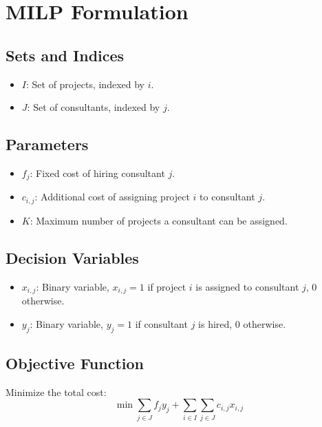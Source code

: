 \documentclass{article}
\begin{document}
\section*{MILP Formulation}

\subsection*{Sets and Indices}
\begin{itemize}
    \item \( I \): Set of projects, indexed by \( i \).
    \item \( J \): Set of consultants, indexed by \( j \).
\end{itemize}

\subsection*{Parameters}
\begin{itemize}
    \item \( f_j \): Fixed cost of hiring consultant \( j \).
    \item \( c_{i,j} \): Additional cost of assigning project \( i \) to consultant \( j \).
    \item \( K \): Maximum number of projects a consultant can be assigned.
\end{itemize}

\subsection*{Decision Variables}
\begin{itemize}
    \item \( x_{i,j} \): Binary variable, \( x_{i,j} = 1 \) if project \( i \) is assigned to consultant \( j \), 0 otherwise.
    \item \( y_j \): Binary variable, \( y_j = 1 \) if consultant \( j \) is hired, 0 otherwise.
\end{itemize}

\subsection*{Objective Function}
Minimize the total cost:
\[
\min \sum_{j \in J} f_j y_j + \sum_{i \in I} \sum_{j \in J} c_{i,j} x_{i,j}
\]
\end{document}
